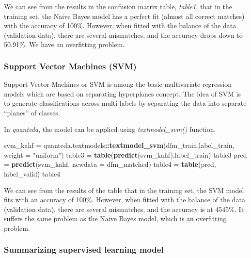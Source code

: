 \documentclass[
]{article}
\newenvironment{Shaded}{\begin{snugshade}}{\end{snugshade}}
\newcommand{\AttributeTok}[1]{\textcolor[rgb]{0.13,0.29,0.53}{#1}}
\newcommand{\FunctionTok}[1]{\textcolor[rgb]{0.13,0.29,0.53}{\textbf{#1}}}
\newcommand{\NormalTok}[1]{#1}
\newcommand{\OtherTok}[1]{\textcolor[rgb]{0.56,0.35,0.01}{#1}}
\newcommand{\SpecialCharTok}[1]{\textcolor[rgb]{0.81,0.36,0.00}{\textbf{#1}}}
\newcommand{\StringTok}[1]{\textcolor[rgb]{0.31,0.60,0.02}{#1}}
\begin{document}
\normalsize

We can see from the results in the confusion matrix table, \emph{table1}, that in the training set, the Naive Bayes model has a perfect fit (almost all correct matches) with the accuracy of 100\%. However, when fitted with the balance of the data (validation data), there are several mismatches, and the accuracy drops down to 50.91\%. We have an overfitting problem.

\hypertarget{support-vector-machines-svm}{%
\subsubsection{Support Vector Machines (SVM)}\label{support-vector-machines-svm}}

Support Vector Machines or SVM is among the basic multivariate regression models which are based on separating hyperplanes concept. The idea of SVM is to generate classifications across multi-labels by separating the data into separate ``planes'' of classes.

In \emph{quanteda}, the model can be applied using \emph{textmodel\_svm()} function.

\footnotesize

\begin{Shaded}
\begin{Highlighting}[]
\NormalTok{svm\_kahf }\OtherTok{=}\NormalTok{ quanteda.textmodels}\SpecialCharTok{::}\FunctionTok{textmodel\_svm}\NormalTok{(dfm\_train,label\_train, }\AttributeTok{weight =} \StringTok{"uniform"}\NormalTok{)}
\NormalTok{table3 }\OtherTok{=} \FunctionTok{table}\NormalTok{(}\FunctionTok{predict}\NormalTok{(svm\_kahf),label\_train)}
\NormalTok{table3}
\NormalTok{pred }\OtherTok{=} \FunctionTok{predict}\NormalTok{(svm\_kahf, }\AttributeTok{newdata =}\NormalTok{ dfm\_matched)}
\NormalTok{table4 }\OtherTok{=} \FunctionTok{table}\NormalTok{(pred, label\_valid)}
\NormalTok{table4}
\end{Highlighting}
\end{Shaded}

\normalsize

We can see from the results of the table that in the training set, the SVM model fits with an accuracy of 100\%. However, when fitted with the balance of the data (validation data), there are several mismatches, and the accuracy is at 4545\%. It suffers the same problem as the Naive Bayes model, which is an overfitting problem.

\hypertarget{summarizing-supervised-learning-model}{%
\subsubsection{Summarizing supervised learning model}\label{summarizing-supervised-learning-model}}
\end{document}
